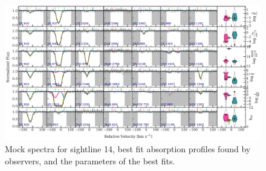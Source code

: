 \documentclass[fleqn,usenatbib]{mnras}
\begin{document}
\begin{figure}
    \centering
    \includegraphics[width=\textwidth]{figures/sample2/best_fits/0014.pdf}
    \caption{
    Mock spectra for sightline 14,
    best fit absorption profiles found by observers,
    and the parameters of the best fits.
    }
    \label{f: sample2 spectrum 14}
\end{figure}
\end{document}

